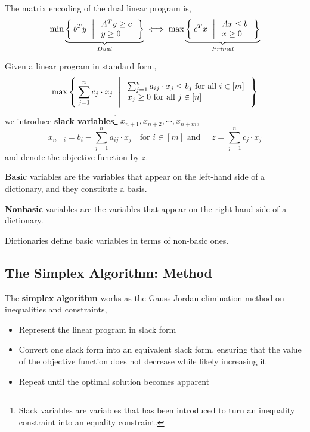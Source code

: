 		\begin{rmk}
			The matrix encoding of the dual linear program is,
			\[
		    \min \underbrace{\Set{ b^Ty \ | \begin{array}{l}
		    A^T y \geq c \\
		    y \geq 0
		  \end{array}}}_{Dual}
			\iff
			\max \underbrace{\Set{ c^Tx \ | \begin{array}{l}
		    Ax \leq b \\
		    x \geq 0
		  \end{array}}}_{Primal}
		\]	
		\end{rmk}

	\begin{defn}[Dictionaries]
		Given a linear program in standard form,
		\[
		    \max \Set{ \sum_{j=1}^n c_j \cdot x_j \ | \begin{array}{l}
		    \sum_{j=1}^n a_{ij} \cdot x_j \leq b_j \text{ for all } i \in [m] \\
		    x_j \geq 0 \text{ for all } j \in [n]
		  \end{array}}
		\]	
		\noindent we introduce \textbf{slack variables}\footnote{Slack variables are variables that has been introduced to turn an inequality constraint into an equality constraint.} $x_{n+1}, x_{n+2}, \cdots, x_{n + m}$,
		\[x_{n+i} = b_i - \sum_{j=1}^n a_{ij} \cdot x_j \quad \text{for $i \in [m]$ and } \quad z = \sum_{j=1}^n c_j \cdot x_j \]
		\noindent and denote the objective function by $z$.
	\end{defn}

	\begin{defn}
		\textbf{Basic} variables are the variables that appear on the left-hand side of a dictionary, and they constitute a basis.
	\end{defn}

	\begin{defn}
		\textbf{Nonbasic} variables are the variables that appear on the right-hand side of a dictionary.
	\end{defn}

	\begin{rmk}
		Dictionaries define basic variables in terms of non-basic ones.
	\end{rmk}

	\subsection{The Simplex Algorithm: Method}
	\begin{defn}
		The \textbf{simplex algorithm} works as the Gauss-Jordan elimination method on inequalities and constraints,
		\begin{itemize}
			\item Represent the linear program in slack form
			\item Convert one slack form into an equivalent slack form, ensuring that the value of the objective function does not decrease while likely increasing it
			\item Repeat until the optimal solution becomes apparent
		\end{itemize}
	\end{defn}

